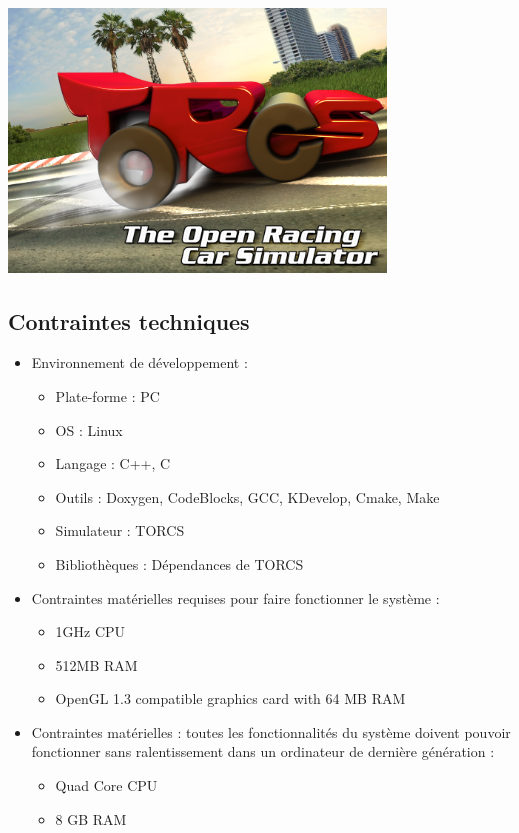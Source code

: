 \documentclass[a4paper,12pt]{article}
\begin{document}
      \begin{center}
    \includegraphics[height=70mm]{../images/torcs.png} 
  \end{center}
  

  \subsection{Contraintes techniques}
  
  \begin{itemize}
   \item Environnement de développement :
   \begin{itemize}
    \item Plate-forme : PC
    \item OS : Linux
    \item Langage : C++, C
    \item Outils : Doxygen, CodeBlocks, GCC, KDevelop, Cmake, Make
    \item Simulateur : TORCS
    \item Bibliothèques : Dépendances de TORCS
   \end{itemize}
   \item Contraintes matérielles requises pour faire fonctionner le système :
   \begin{itemize}
    \item 1GHz CPU
    \item 512MB RAM
    \item OpenGL 1.3 compatible graphics card with 64 MB RAM
   \end{itemize}
   \item Contraintes matérielles : toutes les fonctionnalités du système doivent pouvoir fonctionner sans 
   ralentissement dans un ordinateur de dernière génération :
   \begin{itemize}
    \item Quad Core CPU
    \item 8 GB RAM
   \end{itemize}
  \end{itemize}
  
\end{document}
